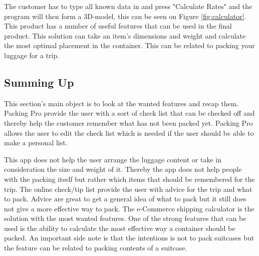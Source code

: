 
The customer has to type all known data in and press "Calculate Rates" and the program will then form a 3D-model, this can be seen on Figure \ref{fig:calculator}.
This product has a number of useful features that can be used in the final product. This solution can take an item's dimensions and weight and calculate the most optimal placement in the container. This can be related to packing your luggage for a trip.

\subsection{Summing Up}

This section's main object is to look at the wanted features and recap them.
Packing Pro provide the user with a sort of check list that can be checked off and thereby help the customer remember what has not been packed yet.
Packing Pro allows the user to edit the check list which is needed if the user should be able to make a personal list.

This app does not help the user arrange the luggage content or take in consideration the size and weight of it. Thereby the app does not help people with the packing itself but rather which items that should be remembered for the trip.
The online check/tip list provide the user with advice for the trip and what to pack. Advice are great to get a general idea of what to pack but it still does not give a more effective way to pack.
The e-Commerce shipping calculator is the solution with the most wanted features. One of the strong features that can be used is the ability to calculate the most effective way a container should be packed. An important side note is that the intentions is not to pack suitcases but the feature can be related to packing contents of a suitcase.

